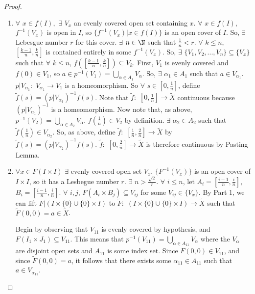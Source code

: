     \begin{proof}
    \begin{enumerate}
    \item $\forall$ $x \in f(I),$ $\exists$ $V_x$ an evenly covered open set containing $x$. $\forall$ $x \in f(I)$, $f^{-1}(V_x)$ is open in $I$, so $\{f^{-1}(V_x)|x \in f(I) \}$ is an open cover of $I$. So, $\exists$ Lebesgue number $r$ for this cover. $\exists$ $n \in \N$ such that $\tfrac{1}{n} < r$.  $\forall$ $k \leq n$, $[ \frac{k-1}{n}, \frac{k}{n}]$ is contained entirely in some $f^{-1}(V_x)$. So, $\exists$ $\{ V_1, V_2, ... , V_n \} \subseteq \{ V_x \}$ such that $\forall$ $k \leq n$, $f([ \frac{k-1}{n}, \frac{k}{n}]) \subseteq V_k$.
    First, $V_1$ is evenly covered and $f(0) \in V_1$, so $a \in p^{-1}(V_1) = \bigcup_{ \alpha \in A_1}V_{\alpha}$. So, $\exists$ $\alpha_1 \in A_1$ such that $a \in V_{\alpha_1}$. $p | V_{\alpha_1}\colon$ $V_{\alpha_1} \to V_1$ is a homeomorphism. So $\forall$ $s \in [0, \tfrac{1}{n}]$, define $\widetilde{f}(s) = (p | V_{\alpha_1})^{-1} f(s)$. Note that $\widetilde{f} \colon$ $[0, \tfrac{1}{n}] \to \widetilde{X}$ continuous because $(p | V_{\alpha_1})^{-1}$ is a homeomorphism.
    Now note that, as above, $p^{-1}(V_2) =  \bigcup_{ \alpha \in A_2}V_{\alpha}$. $f(\tfrac{1}{n}) \in V_2$ by definition. $\exists$ $\alpha_2 \in A_2$ such that $\widetilde{f}(\tfrac{1}{n}) \in V_{\alpha_2}$. So, as above, define $\widetilde{f} \colon$ $[\tfrac{1}{n}, \tfrac{2}{n}] \to \widetilde{X}$ by $\widetilde{f}(s) = (p | V_{\alpha_2})^{-1} f(s)$. $\widetilde{f} \colon$ $[0, \tfrac{2}{n}] \to \widetilde{X}$ is therefore continuous by Pasting Lemma.
    	
    
    \item  $\forall x \in F(I \times I)$ $\exists$ evenly covered open set $V_x$. $\{ F^{-1}(V_x) \}$ is an open cover of $I \times I$, so it has a Lesbegue number $r$. $\exists$ $n > \tfrac{\sqrt{2}}{r}$. $\forall$ $i \leq n$, let $A_i = [\tfrac{i-1}{n}, \tfrac{i}{n}]$, $B_i = [\tfrac{i-1}{n}, \tfrac{i}{n}]$. $\forall$ $i, j$, $F(A_i \times B_j) \subseteq V_{ij}$ for some $V_{ij} \in \{ V_x \}$. By Part 1, we can lift $F|(I \times \{ 0 \} \cup \{ 0 \} \times I)$ to $\widetilde{F} \colon$ $(I \times \{ 0 \} \cup \{ 0 \} \times I) \to \widetilde{X}$ such that $\widetilde{F}(0,0) = a \in \widetilde{X}$.

Begin by observing that $V_{11}$ is evenly covered by hypothesis, and $F(I_1\times J_1)\subseteq V_{11}$. This means that $p^{-1}(V_{11})=\bigcup_{\alpha \in A_{11}}V_\alpha$ where the $V_\alpha$ are disjoint open sets and $A_{11}$ is some index set. Since $F(0,0)\in V_{11}$, and since $\tilde{F}(0,0)=a$, it follows that there exists some $\alpha_{11}\in A_{11}$ such that $a\in V_{\alpha_ {11}}$.


\end{enumerate}
\end{proof}
